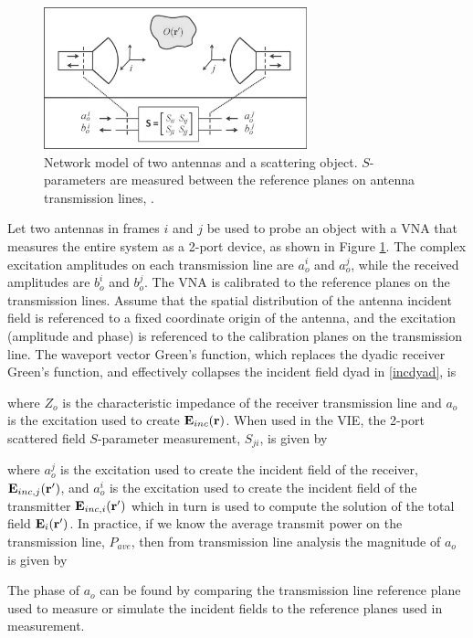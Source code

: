 \begin{figure}[H] 
\centering
\includegraphics[width=3in]{GreensFunctions/Figures/SparamVIE}
\caption{Network model of two antennas and a scattering object. $S$-parameters are measured between the reference planes on antenna transmission lines, \cite{haynes2012vector}.}
\label{sparamviefig}
\end{figure}

Let two antennas in frames $i$ and $j$ be used to probe an object with a VNA that measures the entire system as a 2-port device, as shown in Figure \ref{sparamviefig}. The complex excitation amplitudes on each transmission line are $a_o^i$ and $a_o^j$, while the received amplitudes are $b_o^i$ and $b_o^j$. The VNA is calibrated to the reference planes on the transmission lines. Assume that the spatial distribution of the antenna incident field is referenced to a fixed coordinate origin of the antenna, and the excitation (amplitude and phase) is referenced to the calibration planes on the transmission line. The waveport vector Green's function, which replaces the dyadic receiver Green's function, and effectively collapses the incident field dyad in \eqref{incdyad}, is

\noindent where $Z_o$ is the characteristic impedance of the receiver transmission line and $a_o$ is the excitation used to create $\mathbf{E}_{inc}(\mathbf{r})$. When used in the VIE, the 2-port scattered field $S$-parameter measurement, $S_{ji}$, is given by 

\noindent where $a_o^j$ is the excitation used to create the incident field of the receiver, $\mathbf{E}_{inc,j}(\mathbf{r}')$, and $a_o^i$ is the excitation used to create the incident field of the transmitter $\mathbf{E}_{inc,i}(\mathbf{r}')$ which in turn is used to compute the solution of the total field $\mathbf{E}_{i}(\mathbf{r}')$.  In practice, if we know the average transmit power on the transmission line, $P_{ave}$, then from transmission line analysis the magnitude of $a_o$ is given by 

The phase of $a_o$ can be found by comparing the transmission line reference plane used to measure or simulate the incident fields to the reference planes used in measurement. 









